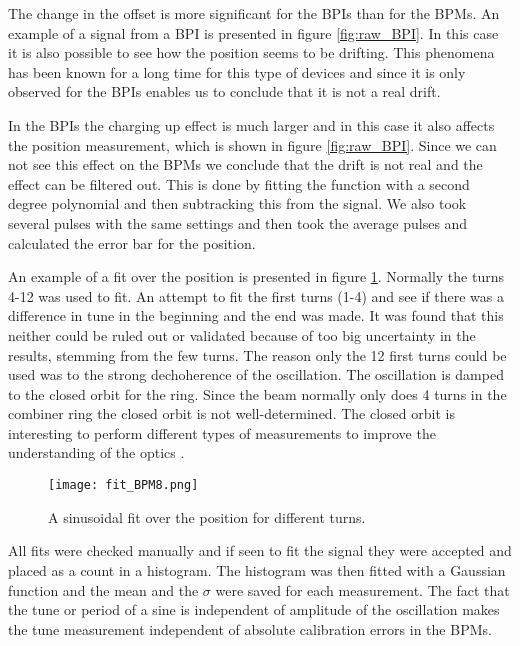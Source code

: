  
The change in the offset is more significant for the BPIs than for the BPMs. 
An example of a signal from a BPI is presented in figure \ref{fig:raw_BPI}. 
In this case it is also possible to see how the position seems to be drifting. 
This phenomena has been known for a long time for this type of devices and 
since it is only observed for the BPIs enables us to conclude that 
it is not a real drift.  
 

In the BPIs the charging up effect is much larger and 
in this case it also affects the position measurement, 
which is shown in figure \ref{fig:raw_BPI}. 
Since we can not see this effect on the BPMs we conclude that 
the drift is not real and the effect can be filtered out. 
This is done by fitting the function with a second degree polynomial and 
then subtracking this from the signal. 
We also took several pulses with the same settings and 
then took the average pulses and calculated the error bar for the position. 
 
 
An example of a fit over the position is presented in figure \ref{fig:fitOfPosition}. 
Normally the turns 4-12 was used to fit. 
An attempt to fit the first turns (1-4) and see if there was a difference 
in tune in the beginning and the end was made. 
It was found that this neither could be ruled out or 
validated because of too big uncertainty in the results, 
stemming from the few turns. 
The reason only the 12 first turns could be used was to the strong dechoherence 
of the oscillation. The oscillation is damped to the closed orbit for the ring. 
Since the beam normally only does 4 turns in the combiner ring 
the closed orbit is not well-determined. 
The closed orbit is interesting to perform different types of measurements to improve 
the understanding of the optics \cite{Minty_Zimmermann_Book}.
\begin{figure}[!h]
\centering
\texttt{[image: fit\_BPM8.png]}
\caption{A sinusoidal fit over the position for different turns. \label{fig:fitOfPosition}}
\end{figure}
All fits were checked manually and if seen to fit the signal they were accepted and
placed as a count in a histogram. 
The histogram was then fitted with a Gaussian function and the mean and 
the $\sigma$ were saved for each measurement.
The fact that the tune or period of a sine is 
independent of amplitude of the oscillation makes the tune measurement 
independent of absolute calibration errors in the BPMs.
 
